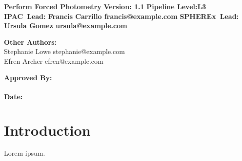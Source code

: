 \documentclass{article}
\newcommand{\spherex}{SPHEREx}
\newcommand{\ipac}{IPAC}
\newcommand{\modulename}{Perform Forced Photometry}
\newcommand{\pipelevel}{L3}
\newcommand{\version}{1.1}
\begin{document}
\begin{center}
{\Huge\bf\modulename}
\vskip 0.25in
{\LARGE\bf Version: \version}
\vskip 0.25in
{\LARGE\noindent\bf Pipeline Level:\pipelevel}
\vskip 0.25in
{\noindent\bf \ipac\ Lead:  Francis Carrillo francis@example.com}
\vskip 0.125in
{\noindent\bf \spherex\ Lead:  Ursula Gomez ursula@example.com }
\vskip 0.125in
\end{center}


{\noindent\bf Other Authors:}\\
Stephanie Lowe stephanie@example.com\\
Efren Archer efren@example.com\\

\vskip 0.25in

{\LARGE\noindent\bf Approved By: \\ \\}
{\LARGE\noindent\bf Date:}\\
\vskip 0.25in

\tableofcontents

\newpage

\section{Introduction}

Lorem ipsum.
\end{document}
